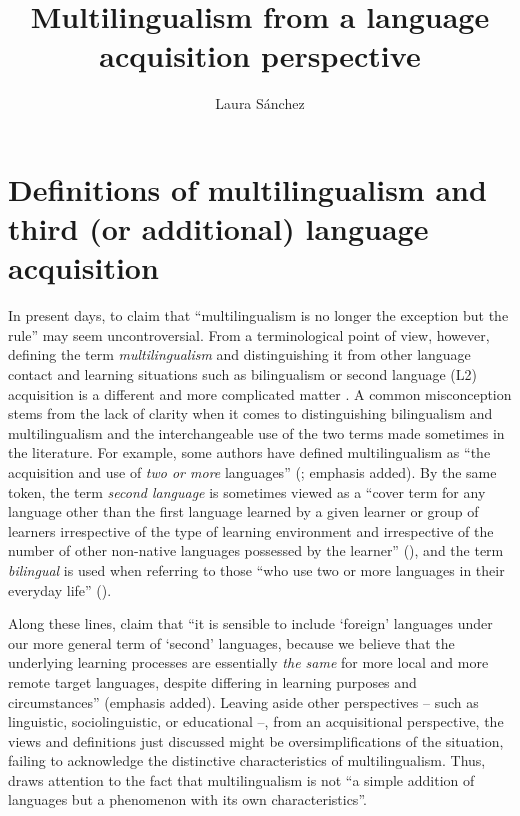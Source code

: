 \documentclass[output=paper]{../langscibook}
\author{Laura Sánchez\affiliation{Stockholms universitet}}
\title{Multilingualism from a language acquisition perspective}
\begin{document}
\maketitle

\section{Definitions of multilingualism and third (or additional) language acquisition}\label{sec:sanchez1:1}

In present days, to claim that “multilingualism is no longer the exception but the rule” \citep[113]{Sánchez2019CLIL} may seem uncontroversial. From a terminological point of view, however, defining the term \textit{multilingualism} and distinguishing it from other language contact and learning situations such as bilingualism or second language (L2) acquisition is a different and more complicated matter \citep{Cenoz2013}. A common misconception stems from the lack of clarity when it comes to distinguishing bilingualism and multilingualism and the interchangeable use of the two terms made sometimes in the literature. For example, some authors have defined multilingualism as “the acquisition and use of \textit{two or more} languages” (\citealt[2]{AroninSingleton2008}; emphasis added). By the same token, the term \textit{second language} is sometimes viewed as a “cover term for any language other than the first language learned by a given learner or group of learners irrespective of the type of learning environment and irrespective of the number of other non-native languages possessed by the learner” (\citealt[7]{SharwoodSmith1994}), and the term \textit{bilingual} is used when referring to those “who use two or more languages in their everyday life” (\citealt[xiii]{Grosjean2010}).

Along these lines, \citet[2]{MitchellMyles1998} claim that “it is sensible to include ‘foreign’ languages under our more general term of ‘second’ languages, because we believe that the underlying learning processes are essentially \textit{the same} for more local and more remote target languages, despite differing in learning purposes and circumstances” (emphasis added). Leaving aside other perspectives – such as linguistic, sociolinguistic, or educational –, from an acquisitional perspective, the views and definitions just discussed might be oversimplifications of the situation, failing to acknowledge the distinctive characteristics of multilingualism. Thus, \citet[14]{Cenoz2013} draws attention to the fact that multilingualism is not “a simple addition of languages but a phenomenon with its own characteristics”.
\end{document}

